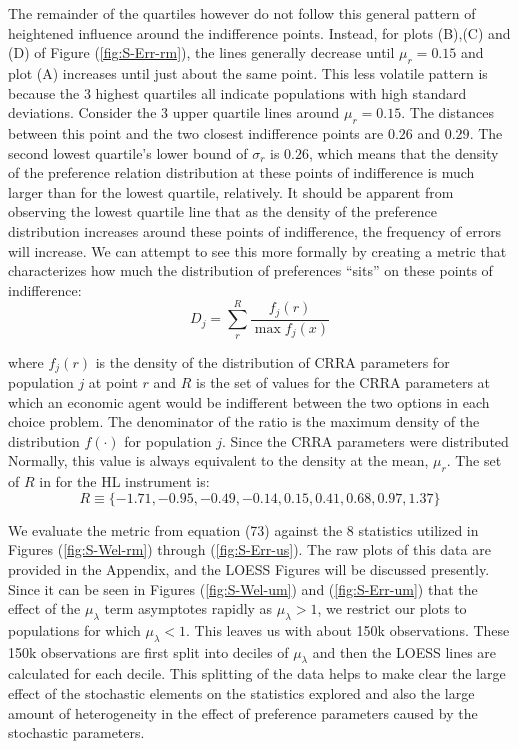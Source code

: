 \documentclass[../main.tex]{subfiles}
\begin{document}
The remainder of the quartiles however do not follow this general pattern of heightened influence around the indifference points.
Instead, for plots (B),(C) and (D) of Figure (\ref{fig:S-Err-rm}), the lines generally decrease until $\mu_r = 0.15$ and plot (A) increases until just about the same point.
This less volatile pattern is because the 3 highest quartiles all indicate populations with high standard deviations.
Consider the 3 upper quartile lines around $\mu_r = 0.15$.
The distances between this point and the two closest indifference points are $0.26$ and $0.29$.
The second lowest quartile's lower bound of $\sigma_r$ is $0.26$, which means that the density of the preference relation distribution at these points of indifference is much larger than for the lowest quartile, relatively.
It should be apparent from observing the lowest quartile line that as the density of the preference distribution increases around these points of indifference, the frequency of errors will increase.
We can attempt to see this more formally by creating a metric that characterizes how much the distribution of preferences \enquote{sits} on these points of indifference:
\begin{equation}
	\label{eq3:Dstat}
	D_j = \sum_r^R \frac{f_j(r)}{\max f_j(x)}
\end{equation}

\noindent where $f_j(r)$ is the density of the distribution of CRRA parameters for population $j$ at point $r$ and $R$ is the set of values for the CRRA parameters at which an economic agent would be indifferent between the two options in each choice problem.
The denominator of the ratio is the maximum density of the distribution $f(\cdot)$ for population $j$.
Since the CRRA parameters were distributed Normally, this value is always equivalent to the density at the mean, $\mu_r$.
The set of $R$ in for the HL instrument is:
\begin{equation}
	R \equiv \{-1.71, -0.95, -0.49, -0.14, 0.15, 0.41, 0.68, 0.97, 1.37\}
\end{equation}

We evaluate the metric from equation (73) against the 8 statistics utilized in Figures (\ref{fig:S-Wel-rm}) through (\ref{fig:S-Err-us}).
The raw plots of this data are provided in the Appendix, and the LOESS Figures will be discussed presently.
Since it can be seen in Figures (\ref{fig:S-Wel-um}) and (\ref{fig:S-Err-um}) that the effect of the $\mu_\lambda$ term asymptotes rapidly as $\mu_\lambda > 1$, we restrict our plots to populations for which $\mu_\lambda < 1$.
This leaves us with about 150k observations.
These 150k observations are first split into deciles of $\mu_\lambda$ and then the LOESS lines are calculated for each decile.
This splitting of the data helps to make clear the large effect of the stochastic elements on the statistics explored and also the large amount of heterogeneity in the effect of preference parameters caused by the stochastic parameters.
\end{document}
